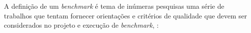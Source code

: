 


A definição de um \textit{benchmark} é tema de inúmeras pesquisas uma série de trabalhos que tentam fornecer orientações e critérios de qualidade que devem ser considerados no projeto e execução de \textit{benchmark}, \cite{Kistowski2015, Chen2014, Folkerts2013, Marco2012, Huppler2009, Gray1992} :



